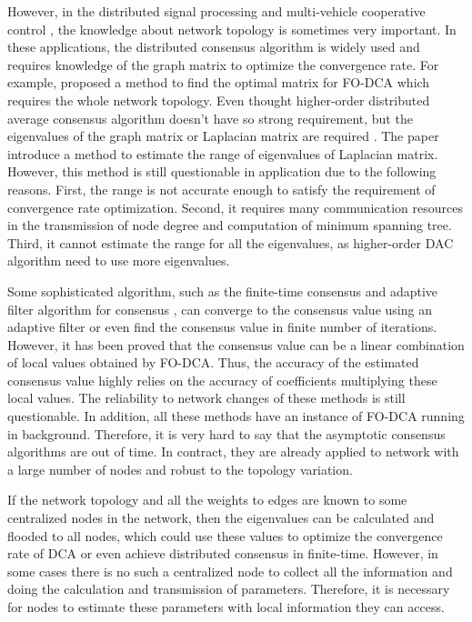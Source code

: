 However, in the distributed signal processing and multi-vehicle cooperative
control \cite{Fax2004}, the knowledge about network topology is sometimes
very important. In these applications, the distributed consensus algorithm
is widely used and requires knowledge of the graph matrix to optimize
the convergence rate. For example, \cite{Xiao2004} proposed a method
to find the optimal matrix for FO-DCA which requires the whole network
topology. Even thought higher-order distributed average consensus
algorithm doesn't have so strong requirement, but the eigenvalues
of the graph matrix or Laplacian matrix are required \cite{Xiong2010}.
The paper \cite{Chung2006} introduce a method to estimate the range
of eigenvalues of Laplacian matrix. However, this method is still
questionable in application due to the following reasons. First, the
range is not accurate enough to satisfy the requirement of convergence
rate optimization. Second, it requires many communication resources
in the transmission of node degree and computation of minimum spanning
tree. Third, it cannot estimate the range for all the eigenvalues,
as higher-order DAC algorithm need to use more eigenvalues.

Some sophisticated algorithm, such as the finite-time consensus \cite{Sundaram2007}
and adaptive filter algorithm for consensus \cite{Cavalcante2010},
can converge to the consensus value using an adaptive filter or even
find the consensus value in finite number of iterations. However,
it has been proved that the consensus value can be a linear combination
of local values obtained by FO-DCA. Thus, the accuracy of the estimated
consensus value highly relies on the accuracy of coefficients multiplying
these local values. The reliability to network changes of these methods
is still questionable. In addition, all these methods have an instance
of FO-DCA running in background. Therefore, it is very hard to say
that the asymptotic consensus algorithms are out of time. In contract,
they are already applied to network with a large number of nodes and
robust to the topology variation. 

If the network topology and all the weights to edges are known to
some centralized nodes in the network, then the eigenvalues can be
calculated and flooded to all nodes, which could use these values
to optimize the convergence rate of DCA or even achieve distributed
consensus in finite-time. However, in some cases there is no such
a centralized node to collect all the information and doing the calculation
and transmission of parameters. Therefore, it is necessary for nodes
to estimate these parameters with local information they can access.

